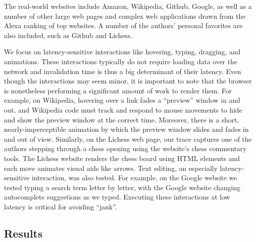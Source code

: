 The \NumWebsites real-world websites include
  Amazon, Wikipedia, Github, Google,
  as well as a number of other
  large web pages and complex web applications
  drawn from the Alexa ranking of top websites.
A number of the authors' personal favorites are also included,
  such as Github and Lichess.

We focus on latency-sensitive interactions
  like hovering, typing, dragging, and animations.
These interactions typically
  do not require loading data over the network
  and invalidation time is thus a big determinant of their latency.
Even though the interactions may seem minor,
  it is important to note that the browser is nonetheless
  performing a significant amount of work to render them.
For example, on Wikipedia, hovering over a link
  fades a ``preview'' window in and out,
  and Wikipedia code must track and respond to mouse movements
  to hide and show the preview window at the correct time.
Moreover, there is a short, nearly-imperceptible animation
  by which the preview window slides and fades in and out of view.
Similarly, on the Lichess web page,
  our trace captures one of the authors
  stepping through a chess opening using the website's
  chess commentary tools.
The Lichess website renders the chess board using HTML elements
  and each move animates visual aids like arrows.
Text editing, an especially latency-sensitive interaction,
  was also tested.
For example, on the Google website we tested
  typing a search term letter by letter,
  with the Google website changing autocomplete suggestions
  as we typed.
Executing these interactions at low latency
  is critical for avoiding ``jank''.

\subsection{Results}

